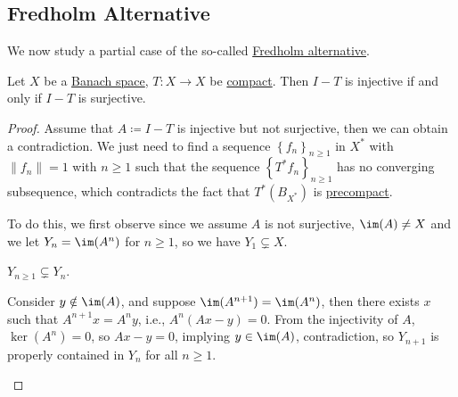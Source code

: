 \subsection{Fredholm Alternative}
We now study a partial case of the so-called \hyperref[thm:Fredholm-alternative]{Fredholm alternative}.

\begin{theorem}\label{thm:Fredholm-alternative}
	Let \(X\) be a \hyperref[def:Banach-space]{Banach space}, \(T\colon X\to  X\) be \hyperref[def:compact-op]{compact}. Then \(I - T\) is injective if and only if \(I - T\) is surjective.
\end{theorem}
\begin{proof}
	Assume that \(A\coloneqq I - T\) is injective but not surjective, then we can obtain a contradiction. We just need to find a sequence \(\left\{ f_{n}  \right\}_{n\geq 1} \) in \(X^{\ast} \) with \(\lVert f_{n}  \rVert = 1\) with \(n\geq 1\) such that the sequence \(\left\{ T^{\ast} f_n \right\}_{n\geq 1} \) has no converging subsequence, which contradicts the fact that \(T^{\ast} (B_{X^{\ast} })\) is \hyperref[def:precompact]{precompact}.

	To do this, we first observe since we assume \(A\) is not surjective, \(\im(A) \neq X\) and we let \(Y_n = \im(A^n)\) for \(n\geq 1\), so we have \(Y_1 \subsetneq X\).
	\begin{claim}
		\(Y_{n\geq 1} \subsetneq Y_n\).
	\end{claim}
	\begin{explanation}
		Consider \(y \notin \im(A)\), and suppose \(\im(A^{n+1})= \im(A^n)\), then there exists \(x\) such that \(A^{n+1}x = A^n y\), i.e., \(A^n (Ax - y) = 0\). From the injectivity of \(A\), \(\ker(A^n) = 0\), so \(Ax - y = 0\), implying \(y\in \im(A)\), contradiction, so \(Y_{n+1}\) is properly contained in \(Y_n\) for all \(n\geq 1\).
	\end{explanation}


\end{proof}
